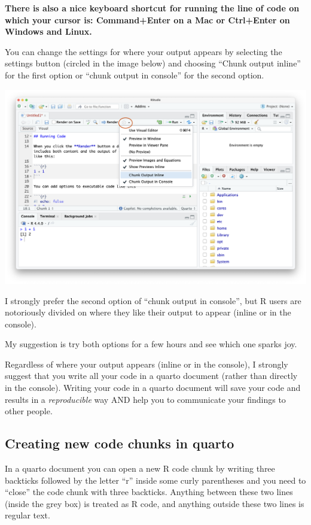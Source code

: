 \documentclass[
  letterpaper,
  DIV=11,
  numbers=noendperiod]{scrreprt}
\begin{document}
\textbf{There is also a nice keyboard shortcut for running the line of
code on which your cursor is: Command+Enter on a Mac or Ctrl+Enter on
Windows and Linux.}

You can change the settings for where your output appears by selecting
the settings button (circled in the image below) and choosing ``Chunk
output inline'' for the first option or ``chunk output in console'' for
the second option.

\includegraphics[width=10.22in,height=\textheight]{figures/output_options.png}

I strongly prefer the second option of ``chunk output in console'', but
R users are notoriously divided on where they like their output to
appear (inline or in the console).

My suggestion is try both options for a few hours and see which one
sparks joy.

Regardless of where your output appears (inline or in the console), I
strongly suggest that you write all your code in a quarto document
(rather than directly in the console). Writing your code in a quarto
document will save your code and results in a \emph{reproducible} way
AND help you to communicate your findings to other people.

\subsection{Creating new code chunks in
quarto}\label{creating-new-code-chunks-in-quarto}

In a quarto document you can open a new R code chunk by writing three
backticks followed by the letter ``r'' inside some curly parentheses and
you need to ``close'' the code chunk with three backticks. Anything
between these two lines (inside the grey box) is treated as R code, and
anything outside these two lines is regular text.
\end{document}
